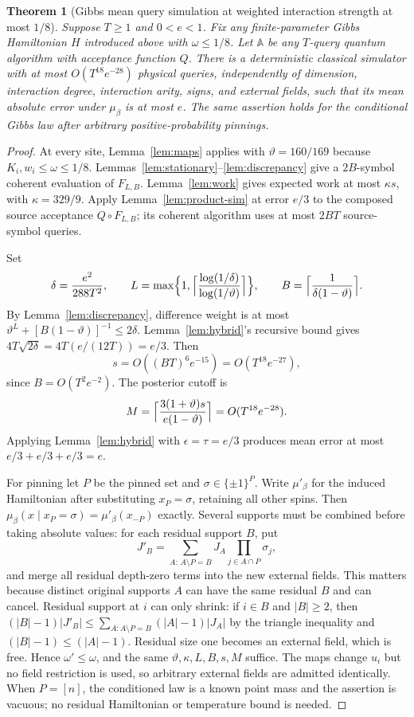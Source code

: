 \documentclass[11pt]{article}
\newtheorem{theorem}{Theorem}[section]
\theoremstyle{definition}\newtheorem{definition}[theorem]{Definition}
\theoremstyle{remark}\newtheorem{remark}[theorem]{Remark}
\begin{document}
\begin{theorem}[Gibbs mean query simulation at weighted interaction strength at most \(1/8\)]\label{main}
Suppose \(T\ge1\) and \(0<e<1\). Fix any finite-parameter Gibbs Hamiltonian \(H\) introduced above with \(\omega\le1/8\). Let \(\mathbb A\) be any \(T\)-query quantum algorithm with acceptance function \(Q\). There is a deterministic classical simulator with at most \(O(T^{18}e^{-28})\) physical queries, independently of dimension, interaction degree, interaction arity, signs, and external fields, such that its mean absolute error under \(\mu_\beta\) is at most \(e\). The same assertion holds for the conditional Gibbs law after arbitrary positive-probability pinnings.
\end{theorem}
\begin{proof}
At every site, Lemma~\ref{lem:maps} applies with \(\vartheta=160/169\) because \(K_i,w_i\le\omega\le1/8\). Lemmas~\ref{lem:stationary}--\ref{lem:discrepancy} give a \(2B\)-symbol coherent evaluation of \(F_{L,B}\). Lemma~\ref{lem:work} gives expected work at most \(\kappa s\), with \(\kappa=329/9\). Apply Lemma~\ref{lem:product-sim} at error \(e/3\) to the composed source acceptance \(Q\circ F_{L,B}\); its coherent algorithm uses at most \(2BT\) source-symbol queries.

Set
\[
 \delta=\frac{e^2}{288T^2},\qquad
 L=\max\Bigl\{1,\Bigl\lceil\frac{\log(1/\delta)}{\log(1/\vartheta)}\Bigr\rceil\Bigr\},\qquad
 B=\Bigl\lceil\frac1{\delta(1-\vartheta)}\Bigr\rceil.
\]
By Lemma~\ref{lem:discrepancy}, difference weight is at most \(\vartheta^L+[B(1-\vartheta)]^{-1}\le2\delta\). Lemma~\ref{lem:hybrid}'s recursive bound gives \(4T\sqrt{2\delta}=4T(e/(12T))=e/3\). Then
\[
 s=O((BT)^6e^{-15})=O(T^{18}e^{-27}),
\]
since \(B=O(T^2e^{-2})\). The posterior cutoff is
\[
 M=\Bigl\lceil\frac{3(1+\vartheta)s}{e(1-\vartheta)}\Bigr\rceil=O(T^{18}e^{-28}).
\]
Applying Lemma~\ref{lem:hybrid} with \(\epsilon=\tau=e/3\) produces mean error at most \(e/3+e/3+e/3=e\).

For pinning let \(P\) be the pinned set and \(\sigma\in\{\pm1\}^P\). Write \(\mu'_\beta\) for the induced Hamiltonian after substituting \(x_P=\sigma\), retaining all other spins. Then \(\mu_\beta(x\mid x_P=\sigma)=\mu'_\beta(x_{-P})\) exactly. Several supports must be combined before taking absolute values: for each residual support \(B\), put
\[
 J'_B=\sum_{A:\,A\setminus P=B}J_A\prod_{j\in A\cap P}\sigma_j,
\]
and merge all residual depth-zero terms into the new external fields. This matters because distinct original supports \(A\) can have the same residual \(B\) and can cancel. Residual support at \(i\) can only shrink: if \(i\in B\) and \(|B|\ge2\), then \((|B|-1)|J'_B|\le\sum_{A:A\setminus P=B}(|A|-1)|J_A|\) by the triangle inequality and \((|B|-1)\le(|A|-1)\). Residual size one becomes an external field, which is free. Hence \(\omega'\le\omega\), and the same \(\vartheta,\kappa,L,B,s,M\) suffice. The maps change \(u_i\) but no field restriction is used, so arbitrary external fields are admitted identically. When \(P=[n]\), the conditioned law is a known point mass and the assertion is vacuous; no residual Hamiltonian or temperature bound is needed.
\end{proof}
\end{document}
